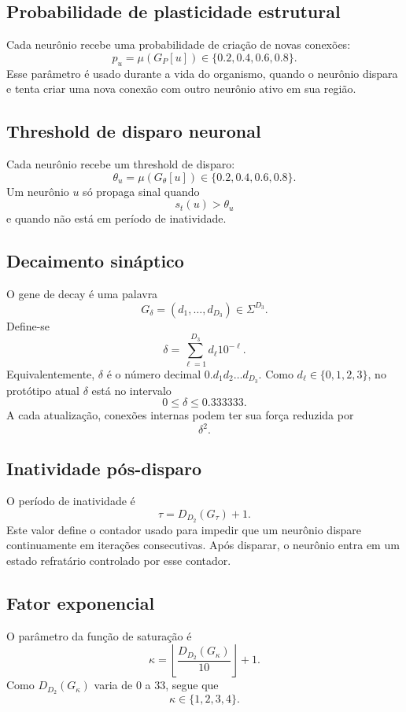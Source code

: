 \documentclass[12pt,a4paper,fleqn]{article}
\newcommand{\SigmaGen}{\Sigma}
\begin{document}
\subsection{Probabilidade de plasticidade estrutural}

Cada neurônio recebe uma probabilidade de criação de novas conexões:
$$
	p_u=\mu(G_P[u])\in\{0.2,0.4,0.6,0.8\}.
$$
Esse parâmetro é usado durante a vida do organismo, quando o neurônio dispara e tenta criar uma nova conexão com outro neurônio ativo em sua região.

\subsection{Threshold de disparo neuronal}

Cada neurônio recebe um threshold de disparo:
$$
	\theta_u=\mu(G_\theta[u])\in\{0.2,0.4,0.6,0.8\}.
$$
Um neurônio $u$ só propaga sinal quando
$$
	s_t(u)>\theta_u
$$
e quando não está em período de inatividade.

\subsection{Decaimento sináptico}

O gene de decay é uma palavra
$$
	G_\delta=(d_1,\ldots,d_{D_3})\in\SigmaGen^{D_3}.
$$
Define-se
$$
	\delta = \sum_{\ell=1}^{D_3}d_\ell 10^{-\ell}.
$$
Equivalentemente, $\delta$ é o número decimal $0.d_1d_2\ldots d_{D_3}$. Como $d_\ell\in\{0,1,2,3\}$, no protótipo atual $\delta$ está no intervalo
$$
	0\leq \delta \leq 0.333333.
$$
A cada atualização, conexões internas podem ter sua força reduzida por
$$
	\delta^2.
$$

\subsection{Inatividade pós-disparo}

O período de inatividade é
$$
	\tau=D_{D_2}(G_\tau)+1.
$$
Este valor define o contador usado para impedir que um neurônio dispare continuamente em iterações consecutivas. Após disparar, o neurônio entra em um estado refratário controlado por esse contador.

\subsection{Fator exponencial}

O parâmetro da função de saturação é
$$
	\kappa=\left\lfloor\frac{D_{D_2}(G_\kappa)}{10}\right\rfloor +1.
$$
Como $D_{D_2}(G_\kappa)$ varia de $0$ a $33$, segue que
$$
	\kappa\in\{1,2,3,4\}.
$$
\end{document}
